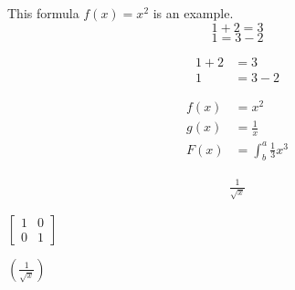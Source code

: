 \documentclass{article}
\begin{document}
This formula $f(x) = x^2$ is an example.
\begin{equation*}
  1 + 2 = 3 
\end{equation*}
\begin{equation*}
  1 = 3 - 2
\end{equation*}

\begin{align*}
 1 + 2 &= 3\\
 1 &= 3 - 2
\end{align*}

\begin{align*}
  f(x) &= x^2\\
  g(x) &= \frac{1}{x}\\
  F(x) &= \int^a_b \frac{1}{3}x^3
\end{align*}

\begin{align*}
\frac{1}{\sqrt{x}}
\end{align*}



$\left[
\begin{matrix}
	1 & 0 \\
	0 & 1
\end{matrix}
\right]$

$\left(\frac{1}{\sqrt{x}}\right)$
\end{document}
